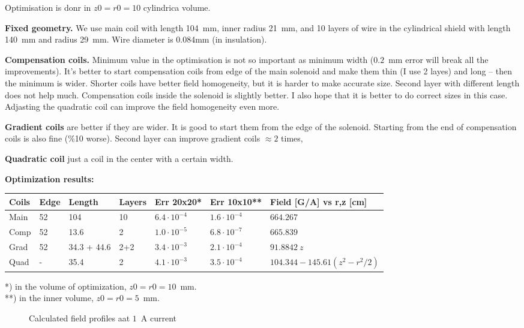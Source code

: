 \documentclass[a4paper]{article}
\newcommand{\image}[3]{
\begin{figure}[#1]
\begin{center}

\caption{\small#3}
\label{image:#2}
\end{center}
\end{figure}
}
\begin{document}
Optimisation is donr in $z0=r0=10$ cylindrica volume.

{\bf Fixed geometry.} We use main coil with length 104~mm, inner radius
21~mm, and 10 layers of wire in the cylindrical shield with length 140~mm
and radius 29~mm. Wire diameter is 0.084mm (in insulation).

{\bf Compensation coils.} Minimum value in the optimisation is not so
important as minimum width ($0.2$~mm error will break all the
improvements). It's better to start compensation coils from edge of the
main solenoid and make them thin (I use 2 layes) and long -- then the
minimum is wider. Shorter coils have better field homogeneity, but it is
harder to make accurate size. Second layer with different length does not
help much. Compensation coils inside the solenoid is slightly better. I
also hope that it is better to do correct sizes in this case. Adjasting
the quadratic coil can improve the field homogeneity even more.

{\bf Gradient coils} are better if they are wider. It is good to start them
from the edge of the solenoid. Starting from the end of compensation coils
is also fine (\%10 worse). Second layer can improve gradient coils $\approx 2$ times,

{\bf Quadratic coil} just a coil in the center with a certain width.

{\bf Optimization results:}

\medskip
\begin{tabular}{lllllll}
Coils & Edge &Length       & Layers & Err 20x20*  & Err 10x10**              & Field [G/A] vs r,z [cm] \\\hline
Main  & 52   & 104         & 10     & $6.4\cdot10^{-4}$ & $1.6\cdot10^{-4}$ & $664.267$\\                      
Comp  & 52   & 13.6        & 2      & $1.0\cdot10^{-5}$ & $6.8\cdot10^{-7}$ & $665.839$\\                      
Grad  & 52   & 34.3 + 44.6 & 2+2    & $3.4\cdot10^{-3}$ & $2.1\cdot10^{-4}$ & $91.8842\ z$\\                    
Quad  & -    & 35.4        & 2      & $4.1\cdot10^{-3}$ & $3.5\cdot10^{-4}$ & $104.344 - 145.61 (z^2-r^2/2)$\\
\end{tabular}
\medskip

\noindent
*) in the volume of optimization, $z0=r0=10$~mm.\\
**) in the inner volume, $z0=r0=5$~mm.




\image{h}{fits}{Calculated field profiles aat $1$~A current}
\end{document}
